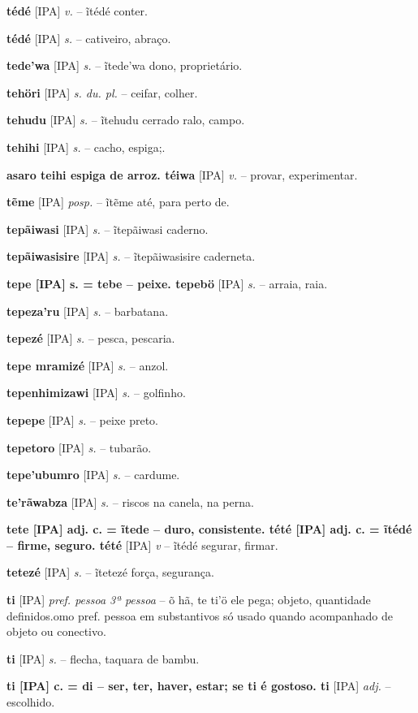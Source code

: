 \textbf{tédé} [IPA] \textit{v.} -- ĩtédé conter.

\textbf{tédé} [IPA] \textit{s.} -- cativeiro, abraço.

\textbf{tede'wa} [IPA] \textit{s.} -- ĩtede'wa dono, proprietário.

\textbf{tehöri} [IPA] \textit{s. du. pl.} -- ceifar, colher.

\textbf{tehudu} [IPA] \textit{s.} -- ĩtehudu cerrado ralo, campo.

\textbf{tehihi} [IPA] \textit{s.} -- cacho, espiga;.

\textbf{asaro teihi espiga de arroz. téiwa} [IPA] \textit{v.} -- provar, experimentar.

\textbf{tẽme} [IPA] \textit{posp.} -- ĩtẽme até, para perto de.

\textbf{tepãiwasi} [IPA] \textit{s.} -- ĩtepãiwasi caderno.

\textbf{tepãiwasisire} [IPA] \textit{s.} -- ĩtepãiwasisire caderneta.

\textbf{tepe [IPA] s. = tebe -- peixe. tepebö} [IPA] \textit{s.} -- arraia, raia.

\textbf{tepeza'ru} [IPA] \textit{s.} -- barbatana.

\textbf{tepezé} [IPA] \textit{s.} -- pesca, pescaria.

\textbf{tepe mramizé} [IPA] \textit{s.} -- anzol.

\textbf{tepenhimizawi} [IPA] \textit{s.} -- golfinho.

\textbf{tepepe} [IPA] \textit{s.} -- peixe preto.

\textbf{tepetoro} [IPA] \textit{s.} -- tubarão.

\textbf{tepe'ubumro} [IPA] \textit{s.} -- cardume.

\textbf{te'rãwabza} [IPA] \textit{s.} -- riscos na canela, na perna.

\textbf{tete [IPA] adj. c. = ĩtede -- duro, consistente. tété [IPA] adj. c. = ĩtédé -- firme, seguro. tété} [IPA] \textit{v} -- ĩtédé segurar, firmar.

\textbf{tetezé} [IPA] \textit{s.} -- ĩtetezé força, segurança.

\textbf{ti} [IPA] \textit{pref. pessoa 3ª pessoa} -- õ hã, te ti'ö ele pega; objeto, quantidade definidos.omo pref. pessoa em substantivos só usado quando acompanhado de objeto ou conectivo.

\textbf{ti} [IPA] \textit{s.} -- flecha, taquara de bambu.

\textbf{ti [IPA] c. = di -- ser, ter, haver, estar; se ti é gostoso. ti} [IPA] \textit{adj.} -- escolhido.

